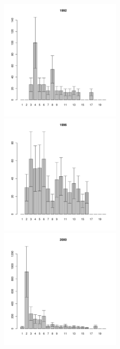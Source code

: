 \begin{figure}[h]

\begin{multicols}{3}
\hfill
\includegraphics[width=60mm]{../White_Sea/Luvenga_II_razrez/zostera_zone_1992_.pdf}
\hfill
\includegraphics[width=60mm]{../White_Sea/Luvenga_II_razrez/zostera_zone_1996_.pdf}
\hfill
\includegraphics[width=60mm]{../White_Sea/Luvenga_II_razrez/zostera_zone_2000_.pdf}
\end{multicols}




\end{figure}
